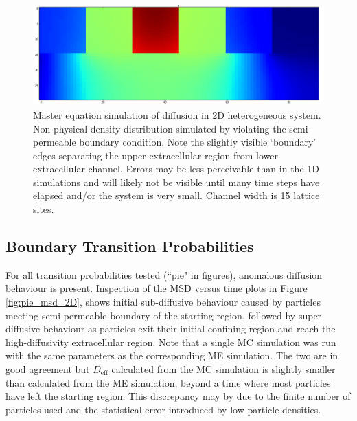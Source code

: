 	\begin{figure}[h!]
		\centering
		\includegraphics[width=1.0\linewidth]{../images/2D/error_in_diffusion}
		\caption[2D: Non-physical (undesirable) solution for a heterogeneous system]{Master equation simulation of diffusion in 2D heterogeneous system. Non-physical density distribution simulated by violating the semi-permeable boundary condition. Note the slightly visible `boundary' edges separating the upper extracellular region from lower extracellular channel. Errors may be less perceivable than in the 1D simulations and will likely not be visible until many time steps have elapsed and/or the system is very small. Channel width is 15 lattice sites.}
		\label{fig:error_in_diffusion}
	\end{figure}

\newpage
\subsection{Boundary Transition Probabilities}
\label{sec:2D-boundary-transition-probabilities}

	For all transition probabilities tested (``pie" in figures), anomalous diffusion behaviour is present. Inspection of the MSD versus time plots in Figure \ref{fig:pie_msd_2D}, shows initial sub-diffusive behaviour caused by particles meeting semi-permeable boundary of the starting region, followed by super-diffusive behaviour as particles exit their initial confining region and reach the high-diffusivity extracellular region.  Note that a single MC simulation was run with the same parameters as the corresponding ME simulation. The two are in good agreement but $ D_\textrm{eff} $ calculated from the MC simulation is slightly smaller than calculated from the ME simulation, beyond a time where most particles have left the starting region. This discrepancy may by due to the finite number of particles used and the statistical error introduced by low particle densities.
	
